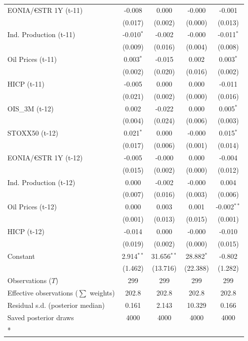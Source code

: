 \begin{longtable}[t]{lcccc}
EONIA/€STR 1Y (t-11) & -0.008 & 0.000 & -0.000 & -0.001\\
 & (0.017) & (0.002) & (0.000) & (0.013)\\
Ind. Production (t-11) & -0.010$^{*}$ & -0.002 & -0.000 & -0.011$^{*}$\\
 & (0.009) & (0.016) & (0.004) & (0.008)\\
Oil Prices (t-11) & 0.003$^{*}$ & -0.015 & 0.002 & 0.003$^{*}$\\
 & (0.002) & (0.020) & (0.016) & (0.002)\\
HICP (t-11) & -0.005 & 0.000 & 0.000 & -0.011\\
 & (0.021) & (0.002) & (0.000) & (0.016)\\
OIS\_3M (t-12) & 0.002 & -0.022 & 0.000 & 0.005$^{*}$\\
 & (0.004) & (0.024) & (0.006) & (0.003)\\
STOXX50 (t-12) & 0.021$^{*}$ & 0.000 & -0.000 & 0.015$^{*}$\\
 & (0.017) & (0.006) & (0.001) & (0.014)\\
EONIA/€STR 1Y (t-12) & -0.005 & -0.000 & 0.000 & -0.004\\
 & (0.015) & (0.002) & (0.000) & (0.012)\\
Ind. Production (t-12) & 0.000 & -0.002 & -0.000 & 0.004\\
 & (0.007) & (0.016) & (0.003) & (0.006)\\
Oil Prices (t-12) & 0.000 & 0.003 & 0.001 & -0.002$^{**}$\\
 & (0.001) & (0.013) & (0.015) & (0.001)\\
HICP (t-12) & -0.014 & 0.000 & -0.000 & -0.010\\
 & (0.019) & (0.002) & (0.000) & (0.015)\\
Constant & 2.914$^{**}$ & 31.656$^{**}$ & 28.882$^{*}$ & -0.802\\
 & (1.462) & (13.716) & (22.388) & (1.282)\\
\midrule
Observations ($T$) & 299 & 299 & 299 & 299\\
Effective observations ($\sum$ weights) & 202.8 & 202.8 & 202.8 & 202.8\\
Residual s.d. (posterior median) & 0.161 & 2.143 & 10.329 & 0.166\\
Saved posterior draws & 4000 & 4000 & 4000 & 4000\\*
\end{longtable}
\endgroup{}

\begingroup\fontsize{7}{9}\selectfont


